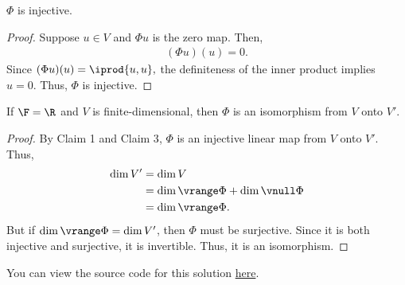 \documentclass{amsart}
\newcommand{\pagenum}{192}
\newcommand{\probnum}{17}
\begin{document}
\vspace{0.5in}

\begin{claim}
 $\Phi$ is injective.
\end{claim}
\begin{proof}
Suppose $u\in V$ and $\Phi u$ is the zero map. Then,
\begin{align*}
    (\Phi u)(u) = 0.
\end{align*}
Since $(\Phi u)(u)=\iprod{u,u},$ the definiteness of the inner
product implies $u=0.$
Thus, $\Phi$ is injective.
\end{proof}

\vspace{0.5in}

\begin{claim}
    If $\F=\R$ and $V$ is finite-dimensional, then
    $\Phi$ is an isomorphism from $V$ onto $V'.$
\end{claim}
\begin{proof}
By \textsf{Claim 1} and \textsf{Claim 3},
$\Phi$ is an injective linear map from $V$ onto $V'.$ Thus,
\begin{align*}
    \dim V' &= \dim V \\
            &= \dim\vrange\Phi+\dim\vnull\Phi \\
            &= \dim\vrange\Phi.
\end{align*}
But if $\dim\vrange\Phi=\dim V'$, then  $\Phi$ must be surjective.
Since it is both injective and surjective, it is invertible.
Thus, it is an isomorphism.
\end{proof}

\vspace{0.5in}


\begin{note*}
You can view the source code for this solution
\href{https://github.com/thomasbreydo/linalg/blob/main/\pagenum_\probnum_Thomas_Breydo.tex}
{here}.
\end{note*}
\end{document}
